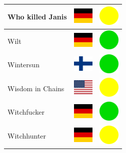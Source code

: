 \documentclass[12pt, a4paper, twoside]{report}
\begin{document}
\begin{center}
\begin{longtable}{|p{5cm}|p{2cm}|p{2cm}|}
 Who killed Janis                                           & \includegraphics[width=1cm]{../img/flags/de} &   \includegraphics[width=1cm]{../likes/m} \\ \hline
 Wilt                                                       & \includegraphics[width=1cm]{../img/flags/de} &   \includegraphics[width=1cm]{../likes/y} \\ \hline
 Wintersun                                                  & \includegraphics[width=1cm]{../img/flags/fi} &   \includegraphics[width=1cm]{../likes/y} \\ \hline
 Wisdom in Chains                                           & \includegraphics[width=1cm]{../img/flags/us} &   \includegraphics[width=1cm]{../likes/m} \\ \hline
 Witchfucker                                                & \includegraphics[width=1cm]{../img/flags/de} &   \includegraphics[width=1cm]{../likes/y} \\ \hline
 Witchhunter                                                & \includegraphics[width=1cm]{../img/flags/de} &   \includegraphics[width=1cm]{../likes/m} \\ \hline

\end{longtable}
\end{center}
\end{document}
